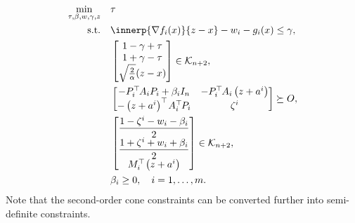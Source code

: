 \documentclass[../../main]{subfiles}
\begin{document}
\begin{equation} \label{eq:sdp}
    \begin{aligned}
        \min_{\tau, \beta, w, \gamma, z} \quad   &\tau \\ 
        \st    \quad   &\innerp{\nabla f_i(x)}{z - x} - w_i - g_i(x) \leq \gamma, \\
                       & \begin{bmatrix} 1 - \gamma + \tau \\
                           1 + \gamma - \tau \\
                           \sqrt{\frac{2}{\alpha}} (z - x)
                       \end{bmatrix} \in \mathcal{K}_{n + 2}, \\
                       & 
                       \begin{bmatrix}
                           -P_i^\T A_i P_i + \beta_i I_n & -P_i^\T A_i \left(z + a^i\right) \\
                           -\left(z + a^i\right)^\T A_i^\T P_i & \zeta^i
                       \end{bmatrix} \succeq
                       O, \\
                       & \begin{bmatrix} \dfrac{1 - \zeta^i - w_i - \beta_i}{2} \\
                           \dfrac{1 + \zeta^i + w_i + \beta_i}{2} \\
                           M_i^\T \left(z + a^i\right)
                       \end{bmatrix} \in \mathcal{K}_{n + 2}, \\
                       & \beta_i \geq 0,  \quad i = 1,\ldots,m.
    \end{aligned}
\end{equation}
Note that the second-order cone constraints can be converted further into semi-definite constraints.
\end{document}
